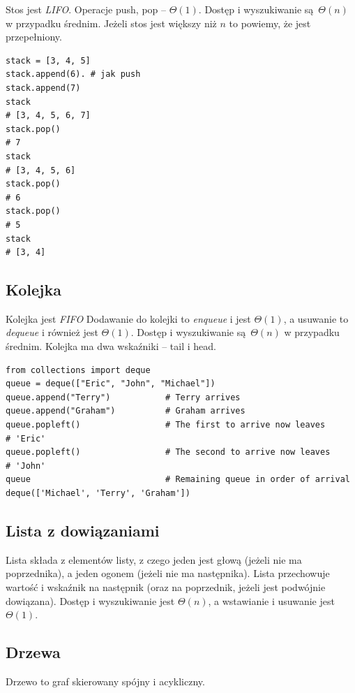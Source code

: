 \documentclass[10pt, oneside]{article}
\theoremstyle{remark}
\begin{document}
Stos jest \emph{LIFO}. Operacje push, pop -- $\Theta(1)$. 
Dostęp i wyszukiwanie są $\Theta(n)$ w przypadku średnim.
Jeżeli stos jest większy niż $n$ to powiemy, że jest przepełniony.

\begin{verbatim}
stack = [3, 4, 5]
stack.append(6). # jak push
stack.append(7)
stack
# [3, 4, 5, 6, 7]
stack.pop()
# 7
stack
# [3, 4, 5, 6]
stack.pop()
# 6
stack.pop()
# 5
stack
# [3, 4]
\end{verbatim}


\subsection{Kolejka}
Kolejka jest \emph{FIFO}
Dodawanie do kolejki to \emph{enqueue} i jest $\Theta(1)$, a usuwanie to \emph{dequeue} i również jest $\Theta(1)$.
Dostęp i wyszukiwanie są $\Theta(n)$ w przypadku średnim.
Kolejka ma dwa wskaźniki -- tail i head.
\begin{verbatim}
from collections import deque
queue = deque(["Eric", "John", "Michael"])
queue.append("Terry")           # Terry arrives
queue.append("Graham")          # Graham arrives
queue.popleft()                 # The first to arrive now leaves
# 'Eric'
queue.popleft()                 # The second to arrive now leaves
# 'John'
queue                           # Remaining queue in order of arrival
deque(['Michael', 'Terry', 'Graham'])
\end{verbatim}

\subsection{Lista z dowiązaniami}
Lista składa z elementów listy, z czego jeden jest głową (jeżeli nie ma poprzednika), a jeden ogonem (jeżeli nie ma następnika).
Lista przechowuje wartość i wskaźnik na następnik (oraz na poprzednik, jeżeli jest podwójnie dowiązana).
Dostęp i wyszukiwanie jest $\Theta(n)$, a wstawianie i usuwanie jest $\Theta(1)$.

\subsection{Drzewa}
Drzewo to graf skierowany spójny i acykliczny.
\end{document}
